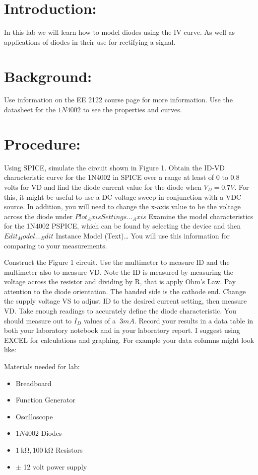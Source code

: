 \documentclass[10pt,a4paper]{article}
\begin{document}
\section*{Introduction:} In this lab we will learn how to model diodes using the IV curve. As well as applications of diodes in their use for rectifying a signal.
\section*{Background:}
Use information on the EE 2122 course page for more information. Use the datasheet for the $1N4002$ to see the properties and curves.
\section*{Procedure:}
Using SPICE, simulate the circuit  shown in  Figure 1.  Obtain the ID-VD characteristic curve for the 1N4002 in SPICE  over a range at least of 0 to 0.8 volts for VD and  find the diode current value for the  diode when $V_{D} = 0.7V$.  For this, it might be useful to use a DC voltage sweep in conjunction with a VDC source. In addition, you will need to change the x-axis value to be the voltage across the diode under $ Plot_Axis Settings…_Axis$ 
Examine the model characteristics for the 1N4002 PSPICE, which can be
found by selecting the device and then $Edit_Model…_Edit$ Instance Model (Text)…  You 	will use 	this 	information for comparing to your measurements.
 
Construct the Figure 1 circuit. Use the multimeter to   measure ID and the multimeter also to measure VD.    Note the ID is  measured by measuring the voltage across the resistor and dividing by R, that is apply Ohm’s Law.    Pay attention to the diode orientation. The banded side is the cathode end.  Change the supply voltage VS to adjust ID to the desired current setting, then measure VD. Take enough readings to accurately define the diode characteristic.   You should measure out to $I_{D}$ values of a $~3mA$.  Record your results in a data table in both your laboratory notebook and in your laboratory report.   I suggest using EXCEL for calculations and graphing.  For example your data columns might look like:


\begin{flushleft}
Materials needed for lab:
\end{flushleft}


\begin{itemize}
\item Breadboard
\item Function Generator 
\item Oscilloscope
\item  $1N4002$ Diodes 
\item  $\SI{1}{\kohm},\SI{100}{\kohm}$ Resistors
\item $\pm$ 12 volt power supply \\

\end{itemize}
\end{document}
